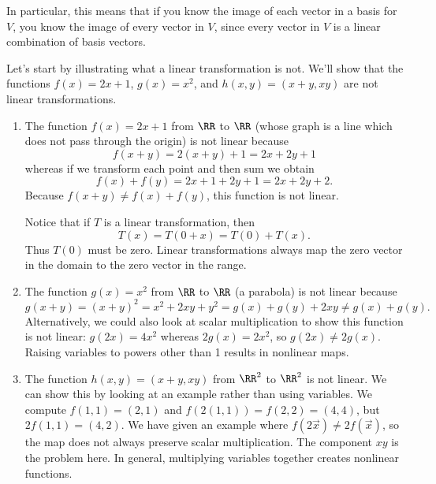 %
In particular, this means that if you know the image of each vector in a basis for $V$, you know the image of every vector in $V$, since every vector in $V$ is a linear combination of basis vectors.
\begin{example}
Let's start by illustrating what a linear transformation is not. We'll show that the functions $f(x) = 2x+1$, $g(x)=x^2$, and $h(x,y)=(x+y,xy)$ are not linear transformations.
\begin{enumerate}
\item The function $f(x)=2x+1$ from $\RR$ to $\RR$ (whose graph is a line which does not pass through the origin) is not linear because
  $$f(x+y)=2(x+y)+1 = 2x+2y+1$$ whereas if we transform each point and then sum we obtain $$f(x)+f(y)=2x+1+2y+1 = 2x+2y+2.$$
  Because $f(x+y)\neq f(x)+f(y)$, this function is not linear.
  
  Notice that if $T$ is a linear transformation, then $$T(x)=T(0+x)=T(0)+T(x).$$ Thus $T(0)$ must be zero.
 Linear transformations always map the zero vector in the domain to the zero vector in the range.

\item The function $g(x)=x^2$ from $\RR$ to $\RR$ (a parabola) is not linear because 
  $$g(x+y)=(x+y)^2 = x^2+2xy+y^2 = g(x)+g(y)+2xy \neq g(x)+g(y).$$
  Alternatively, we could also look at scalar multiplication to show this function is not linear: $g(2x) = 4x^2$ whereas $2g(x) = 2x^2$, so $g(2x)\neq 2g(x)$.  Raising variables to powers other than 1 results in nonlinear maps.

\item   {}%
 The function $h(x,y)=(x+y,xy)$ from $\RR^2$ to $\RR^2$ is not linear. We can show this by looking at an example rather than using variables. We compute $f(1,1)=(2,1)$ and $f(2(1,1)) = f(2,2)=(4,4)$, but $2f(1,1) = (4,2)$.  We have given an example where $f(2\vec x)\neq 2f(\vec x)$, so the map does not always preserve scalar multiplication. 
  The component $xy$ is the problem here. In general, multiplying variables together creates nonlinear functions.  
\end{enumerate}
\end{example}

